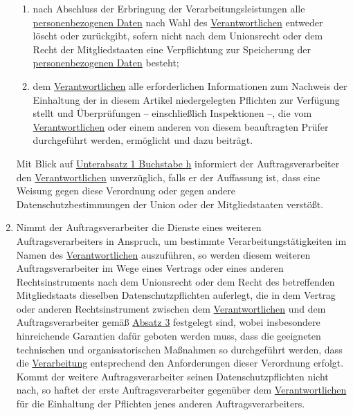 \begin{enumerate}
\begin{enumerate}
    \item nach Abschluss der Erbringung der Verarbeitungsleistungen alle \hyperref[itm:04-1]{personenbezogenen Daten} nach Wahl des
     \hyperref[itm:04-7]{Verantwortlichen} entweder löscht oder zurückgibt, sofern nicht nach dem Unionsrecht oder dem Recht der
     Mitgliedstaaten eine Verpflichtung zur Speicherung der \hyperref[itm:04-1]{personenbezogenen Daten} besteht;
    \label{itm:28-3-1g}

    \item dem \hyperref[itm:04-7]{Verantwortlichen} alle erforderlichen Informationen zum Nachweis der Einhaltung der in diesem Artikel
     niedergelegten Pflichten zur Verfügung stellt und Überprüfungen -- einschließlich Inspektionen –, die vom
     \hyperref[itm:04-7]{Verantwortlichen} oder einem anderen von diesem beauftragten Prüfer durchgeführt werden, ermöglicht und dazu
     beiträgt.
    \label{itm:28-3-1h}

  \end{enumerate}

  Mit Blick auf \hyperref[itm:28-3-1h]{Unterabsatz 1 Buchstabe h} informiert der Auftragsverarbeiter den
  \hyperref[itm:04-7]{Verantwortlichen}
  unverzüglich, falls er der Auffassung ist, dass eine Weisung gegen diese Verordnung oder gegen andere
  Datenschutzbestimmungen der Union oder der Mitgliedstaaten verstößt.
  \label{itm:28-3-2}

  \item Nimmt der Auftragsverarbeiter die Dienste eines weiteren Auftragsverarbeiters in Anspruch, um bestimmte
   Verarbeitungstätigkeiten im Namen des \hyperref[itm:04-7]{Verantwortlichen} auszuführen, so werden diesem weiteren Auftragsverarbeiter im
   Wege eines Vertrags oder eines anderen Rechtsinstruments nach dem Unionsrecht oder dem Recht des betreffenden
   Mitgliedstaats dieselben Datenschutzpflichten auferlegt, die in dem Vertrag oder anderen Rechtsinstrument zwischen
   dem \hyperref[itm:04-7]{Verantwortlichen} und dem Auftragsverarbeiter gemäß \hyperref[itm:28-3-1]{Absatz 3} festgelegt sind, wobei
   insbesondere hinreichende Garantien dafür geboten werden muss, dass die geeigneten technischen und organisatorischen
   Maßnahmen so durchgeführt werden, dass die \hyperref[itm:04-2]{Verarbeitung} entsprechend den Anforderungen dieser Verordnung erfolgt.
   Kommt der weitere Auftragsverarbeiter seinen Datenschutzpflichten nicht nach, so haftet der erste
   Auftragsverarbeiter gegenüber dem \hyperref[itm:04-7]{Verantwortlichen} für die Einhaltung der Pflichten jenes anderen
   Auftragsverarbeiters.
  \label{itm:28-4}


\end{enumerate}
